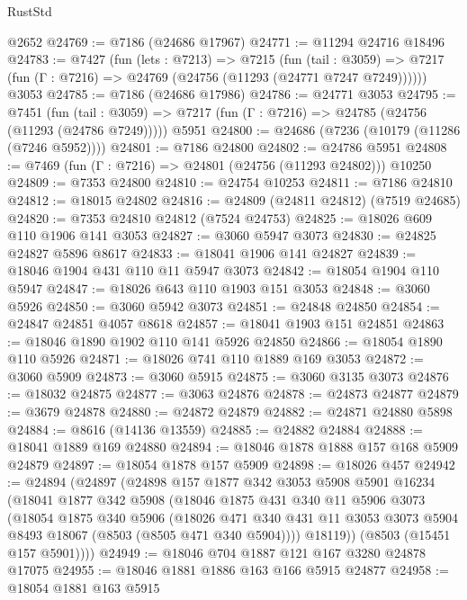 \begin{lexlean}{RustStd}
\begin{coremodule}
    @2652
@24769 := @7186 (@24686 @17967)
@24771 := @11294 @24716 @18496
@24783 := @7427
    (fun (lets : @7213) =>
    @7215
      (fun (tail : @3059) =>
      @7217 (fun (Γ : @7216) => @24769 (@24756 (@11293 (@24771 @7247 @7249))))))
    @3053
@24785 := @7186 (@24686 @17986)
@24786 := @24771 @3053
@24795 := @7451
    (fun (tail : @3059) => @7217 (fun (Γ : @7216) => @24785 (@24756 (@11293 (@24786 @7249)))))
    @5951
@24800 := @24686 (@7236 (@10179 (@11286 (@7246 @5952))))
@24801 := @7186 @24800
@24802 := @24786 @5951
@24808 := @7469 (fun (Γ : @7216) => @24801 (@24756 (@11293 @24802))) @10250
@24809 := @7353 @24800
@24810 := @24754 @10253
@24811 := @7186 @24810
@24812 := @18015 @24802
@24816 := @24809 (@24811 @24812) (@7519 @24685)
@24820 := @7353 @24810 @24812 (@7524 @24753)
@24825 := @18026 @609 @110 @1906 @141 @3053
@24827 := @3060 @5947 @3073
@24830 := @24825 @24827 @5896 @8617
@24833 := @18041 @1906 @141 @24827
@24839 := @18046 @1904 @431 @110 @11 @5947 @3073
@24842 := @18054 @1904 @110 @5947
@24847 := @18026 @643 @110 @1903 @151 @3053
@24848 := @3060 @5926
@24850 := @3060 @5942 @3073
@24851 := @24848 @24850
@24854 := @24847 @24851 @4057 @8618
@24857 := @18041 @1903 @151 @24851
@24863 := @18046 @1890 @1902 @110 @141 @5926 @24850
@24866 := @18054 @1890 @110 @5926
@24871 := @18026 @741 @110 @1889 @169 @3053
@24872 := @3060 @5909
@24873 := @3060 @5915
@24875 := @3060 @3135 @3073
@24876 := @18032 @24875
@24877 := @3063 @24876
@24878 := @24873 @24877
@24879 := @3679 @24878
@24880 := @24872 @24879
@24882 := @24871 @24880 @5898
@24884 := @8616 (@14136 @13559)
@24885 := @24882 @24884
@24888 := @18041 @1889 @169 @24880
@24894 := @18046 @1878 @1888 @157 @168 @5909 @24879
@24897 := @18054 @1878 @157 @5909
@24898 := @18026 @457
@24942 := @24894
    (@24897
      (@24898
        @157
        @1877
        @342
        @3053
        @5908
        @5901
        @16234
        (@18041
          @1877
          @342
          @5908
          (@18046
            @1875
            @431
            @340
            @11
            @5906
            @3073
            (@18054
              @1875
              @340
              @5906
              (@18026
                @471
                @340
                @431
                @11
                @3053
                @3073
                @5904
                @8493
                @18067
                (@8503 (@8505 @471 @340 @5904))))
            @18119))
        (@8503 (@15451 @157 @5901))))
@24949 := @18046 @704 @1887 @121 @167 @3280 @24878 @17075
@24955 := @18046 @1881 @1886 @163 @166 @5915 @24877
@24958 := @18054 @1881 @163 @5915

\end{coremodule}
\end{lexlean}
